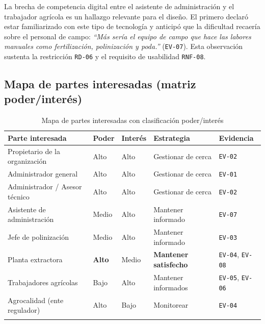 \documentclass[11pt,a4paper]{article}
\newcommand{\id}[1]{\texttt{\begingroup\hyphenpenalty=10000\relax#1\endgroup}}
\renewcommand{\id}[1]{\texttt{#1}}
\begin{document}
\vspace{0.2cm}
\noindent{}

\noindent
La brecha de competencia digital entre el asistente de administración y el trabajador agrícola es
un hallazgo relevante para el diseño. El primero declaró estar familiarizado con este tipo de
tecnología y anticipó que la dificultad recaería sobre el personal de campo: \emph{``Más sería el equipo de campo
que hace las labores manuales como fertilización, polinización y poda.''} (\id{EV-07}). Esta observación sustenta la restricción
\id{RD-06} y el requisito de usabilidad \id{RNF-08}.

\subsection{Mapa de partes interesadas (matriz poder/interés)}

\begin{longtable}{|L{4.2cm}|C{1.8cm}|C{1.8cm}|L{3.4cm}|C{2.2cm}|}
\hline
{}\textbf{Parte interesada} & \textbf{Poder} & \textbf{Interés} & \textbf{Estrategia} & \textbf{Evidencia} \\
\hline
\endhead
Propietario de la organización & Alto & Alto & Gestionar de cerca & \id{EV-02} \\ \hline
Administrador general & Alto & Alto & Gestionar de cerca & \id{EV-01} \\ \hline
Administrador / Asesor técnico & Alto & Alto & Gestionar de cerca & \id{EV-02} \\ \hline
Asistente de administración & Medio & Alto & Mantener informado & \id{EV-07} \\ \hline
Jefe de polinización & Medio & Alto & Mantener informado & \footnotesize \id{EV-03} \\ \hline
Planta extractora & \textbf{Alto} & Medio & \textbf{Mantener satisfecho} & \id{EV-04}, \id{EV-08} \\ \hline
Trabajadores agrícolas & Bajo & Alto & Mantener informados & \id{EV-05}, \id{EV-06} \\ \hline
Agrocalidad (ente regulador) & Alto & Bajo & Monitorear & \footnotesize \id{EV-04} \\ \hline
\caption{Mapa de partes interesadas con clasificación poder/interés}
\end{longtable}
\end{document}
